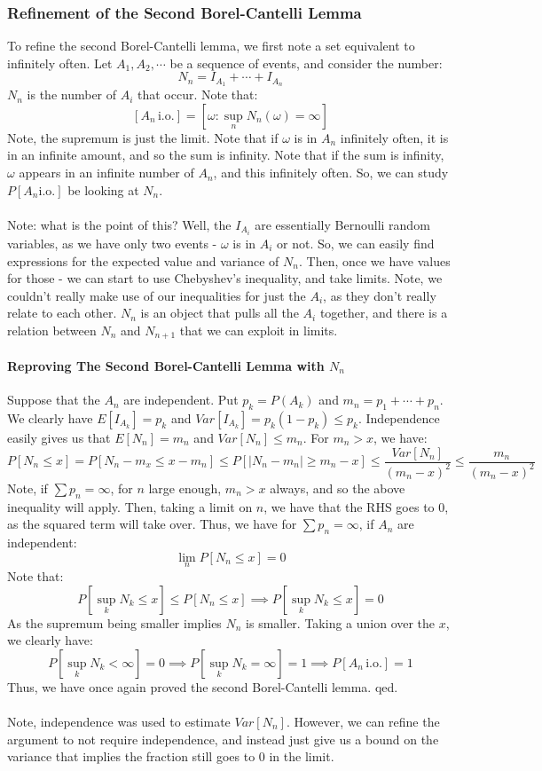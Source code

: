 \documentclass[12pt,a4paper]{article}
\newcommand{\1}[1]{\mathbbm{1}\left\{ #1 \right\}}
\newcommand{\io}{\text{i.o.}}
\begin{document}
\subsubsection{Refinement of the Second Borel-Cantelli Lemma}
To refine the second Borel-Cantelli lemma, we first note a set equivalent to infinitely often. Let $A_1, A_2, \cdots$ be a sequence of events, and consider the number:
$$
	N_n = I_{A_1} + \cdots + I_{A_n}
$$
$N_n$ is the number of $A_i$ that occur. Note that:
$$
	\left[A_n \, \io\right] = \left[\omega : \sup_n N_n(\omega) = \infty\right]
$$
Note, the supremum is just the limit. Note that if $\omega$ is in $A_n$ infinitely often, it is in an infinite amount, and so the sum is infinity. Note that if the sum is infinity, $\omega$ appears in an infinite number of $A_n$, and this infinitely often. So, we can study $P[A_n \io]$ be looking at $N_n$.
\\\\
Note: what is the point of this? Well, the $I_{A_i}$ are essentially Bernoulli random variables, as we have only two events - $\omega$ is in $A_i$ or not. So, we can easily find expressions for the expected value and variance of $N_n$. Then, once we have values for those - we can start to use Chebyshev's inequality, and take limits. Note, we couldn't really make use of our inequalities for just the $A_i$, as they don't really relate to each other. $N_n$ is an object that pulls all the $A_i$ together, and there is a relation between $N_n$ and $N_{n+1}$ that we can exploit in limits.

\paragraph{Reproving The Second Borel-Cantelli Lemma with $N_n$} Suppose that the $A_n$ are independent. Put $p_k = P(A_k)$ and $m_n = p_1 + \cdots + p_n$. We clearly have $E[I_{A_k}] = p_k$ and $Var[I_{A_k}] = p_k (1 - p_k) \leq p_k$. Independence easily gives us that $E[N_n] = m_n$ and $Var[N_n] \leq m_n$. For $m_n > x$, we have:
$$
	P[N_n \leq x] = P\left[N_n - m_x \leq x - m_n\right] \leq
	P\left[|N_n - m_n| \geq m_n - x\right] \leq
	\frac{Var[N_n]}{(m_n - x)^2} \leq
	\frac{m_n}{(m_n - x)^2}
$$
Note, if $\sum p_n = \infty$, for $n$ large enough, $m_n > x$ always, and so the above inequality will apply. Then, taking a limit on $n$, we have that the RHS goes to $0$, as the squared term will take over. Thus, we have for $\sum p_n = \infty$, if $A_n$ are independent:
$$
	\lim_n P[N_n \leq x] = 0
$$
Note that:
$$
	P\left[\sup_k N_k \leq x\right] \leq P[N_n \leq x] \implies
	P\left[\sup_k N_k \leq x\right] = 0
$$
As the supremum being smaller implies $N_n$ is smaller. Taking a union over the $x$, we clearly have:
$$
	P\left[\sup_k N_k < \infty\right] = 0 \implies
	P\left[\sup_k N_k = \infty\right] = 1 \implies P[A_n \, \io] = 1
$$
Thus, we have once again proved the second Borel-Cantelli lemma. qed.
\\\\
Note, independence was used to estimate $Var[N_n]$. However, we can refine the argument to not require independence, and instead just give us a bound on the variance that implies the fraction still goes to $0$ in the limit.
\end{document}
